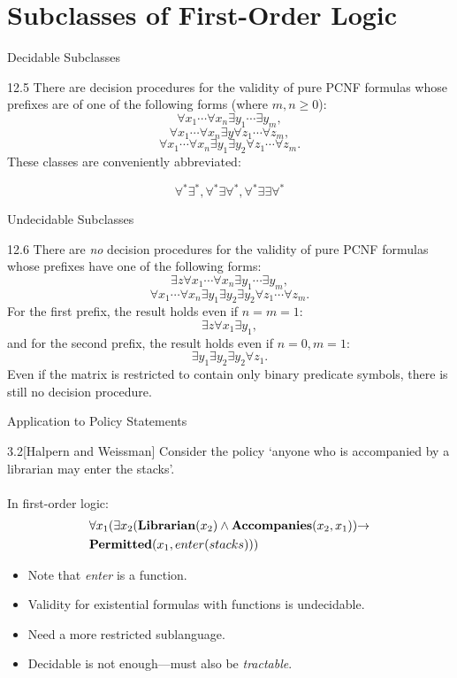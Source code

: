 \documentclass[style=sailor,size=12pt]{powerdot}
\begin{document}
\section[slide=false]{Subclasses of First-Order Logic}
\begin{slide}[bm=,toc=]{Decidable Subclasses}
\begin{thm}{12.5}
There are decision procedures for the validity of pure PCNF formulas whose
prefixes are of one of the following forms (where $m,n \geq 0$):
\[ \forall x_1\cdots \forall x_n \exists y_1 \cdots \exists y_m, \]
\[ \forall x_1\cdots \forall x_n \exists y \forall z_1 \cdots \forall z_m, \]
\[ \forall x_1\cdots \forall x_n \exists y_1 \exists y_2 \forall z_1 \cdots \forall z_m. \]
These classes are conveniently abbreviated: 

\[    \forall^*\exists^*, \forall^*\exists \forall^*,   \forall^*\exists \exists \forall^*\]
\end{thm}
\end{slide}

\begin{wideslide}[bm=,toc=]{Undecidable Subclasses}
\begin{thm}{12.6}
There are \emph{no} decision procedures for the validity of pure PCNF formulas whose
prefixes have one of the following forms:
\[ \exists z \forall x_1\cdots \forall x_n \exists y_1 \cdots \exists y_m, \]
\[ \forall x_1\cdots \forall x_n \exists y_1 \exists y_2 \exists y_2 \forall z_1 \cdots \forall z_m. \]
For the first prefix, the result holds even if $n = m = 1$:
\[ \exists z \forall x_1 \exists y_1, \]
and for the second prefix, the result holds even if $n = 0, m = 1$:
\[ \exists y_1 \exists y_2 \exists y_2 \forall z_1. \]
Even if the matrix is restricted to contain only binary predicate symbols, there
is still no decision procedure.
\end{thm}
\end{wideslide}

\begin{wideslide}[bm=,toc=]{Application to Policy Statements}
\begin{ex}{3.2}[Halpern and Weissman]
Consider the policy `anyone who is accompanied by a librarian
may enter the stacks'.\\~\\
In first-order logic:
\begin{align*}
& \forall x_1 (\exists x_2 (\mbox{\bf Librarian}(x_2) \land \mbox{\bf Accompanies}(x_2,x_1)) \mathbin{\rightarrow} \\
& \mbox{\bf Permitted}(x_1, enter(stacks)))
\end{align*}
\end{ex}
\begin{itemize} 
\item Note that \emph{enter} is a function.
\item Validity for existential formulas with functions is undecidable. 
\item Need a more restricted sublanguage.
\item Decidable is not enough---must also be \emph{tractable}.
\end{itemize}
\end{wideslide}
\end{document}
